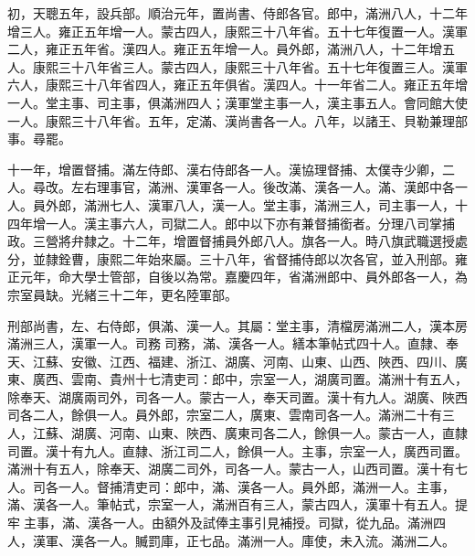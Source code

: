 \begin{pinyinscope}
初，天聰五年，設兵部。順治元年，置尚書、侍郎各官。郎中，滿洲八人，十二年增三人。雍正五年增一人。蒙古四人，康熙三十八年省。五十七年復置一人。漢軍二人，雍正五年省。漢四人。雍正五年增一人。員外郎，滿洲八人，十二年增五人。康熙三十八年省三人。蒙古四人，康熙三十八年省。五十七年復置三人。漢軍六人，康熙三十八年省四人，雍正五年俱省。漢四人。十一年省二人。雍正五年增一人。堂主事、司主事，俱滿洲四人；漢軍堂主事一人，漢主事五人。會同館大使一人。康熙三十八年省。五年，定滿、漢尚書各一人。八年，以諸王、貝勒兼理部事。尋罷。

十一年，增置督捕。滿左侍郎、漢右侍郎各一人。漢協理督捕、太僕寺少卿，二人。尋改。左右理事官，滿洲、漢軍各一人。後改滿、漢各一人。滿、漢郎中各一人。員外郎，滿洲七人、漢軍八人，漢一人。堂主事，滿洲三人，司主事一人，十四年增一人。漢主事六人，司獄二人。郎中以下亦有兼督捕銜者。分理八司掌捕政。三營將弁隸之。十二年，增置督捕員外郎八人。旗各一人。時八旗武職選授處分，並隸銓曹，康熙二年始來屬。三十八年，省督捕侍郎以次各官，並入刑部。雍正元年，命大學士管部，自後以為常。嘉慶四年，省滿洲郎中、員外郎各一人，為宗室員缺。光緒三十二年，更名陸軍部。

刑部尚書，左、右侍郎，俱滿、漢一人。其屬：堂主事，清檔房滿洲二人，漢本房滿洲三人，漢軍一人。司務司務，滿、漢各一人。繕本筆帖式四十人。直隸、奉天、江蘇、安徽、江西、福建、浙江、湖廣、河南、山東、山西、陜西、四川、廣東、廣西、雲南、貴州十七清吏司：郎中，宗室一人，湖廣司置。滿洲十有五人，除奉天、湖廣兩司外，司各一人。蒙古一人，奉天司置。漢十有九人。湖廣、陜西司各二人，餘俱一人。員外郎，宗室二人，廣東、雲南司各一人。滿洲二十有三人，江蘇、湖廣、河南、山東、陜西、廣東司各二人，餘俱一人。蒙古一人，直隸司置。漢十有九人。直隸、浙江司二人，餘俱一人。主事，宗室一人，廣西司置。滿洲十有五人，除奉天、湖廣二司外，司各一人。蒙古一人，山西司置。漢十有七人。司各一人。督捕清吏司：郎中，滿、漢各一人。員外郎，滿洲一人。主事，滿、漢各一人。筆帖式，宗室一人，滿洲百有三人，蒙古四人，漢軍十有五人。提牢主事，滿、漢各一人。由額外及試俸主事引見補授。司獄，從九品。滿洲四人，漢軍、漢各一人。贓罰庫，正七品。滿洲一人。庫使，未入流。滿洲二人。


\end{pinyinscope}
